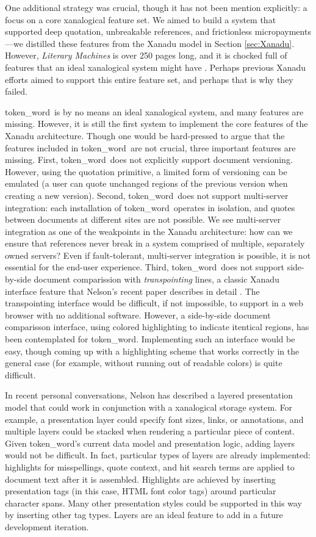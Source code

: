 \documentclass{acm_proc_article-sp}
\newcommand{\tw}{token\_word}
\begin{document}
One additional strategy was crucial, though it has not been mention explicitly:  a focus on a core xanalogical feature set.
We aimed to build a system that supported deep quotation, unbreakable references, and frictionless micropayments---we distilled these features from the Xanadu model in Section \ref{sec:Xanadu}.
However, \textit{Literary Machines} is over 250 pages long, and it is chocked full of features that an ideal xanalogical system might have \cite{NelsonLiteraryMachines}.
Perhaps previous Xanadu efforts aimed to support this entire feature set, and perhaps that is why they failed.

\tw \  is by no means an ideal xanalogical system, and many features are missing.
However, it is still the first system to implement the core features of the Xanadu architecture.
Though one would be hard-pressed to argue that the features included in \tw \  are not crucial, three important features are missing.
First, \tw \  does not explicitly support document versioning.
However, using the quotation primitive, a limited form of versioning can be emulated (a user can quote unchanged regions of the previous version when creating a new version).
Second, \tw \  does not support multi-server integration:  each installation of \tw \  operates in isolation, and quotes between documents at different sites are not possible.
We see multi-server integration as one of the weakpoints in the Xanadu architecture:  how can we ensure that references never break in a system comprised of multiple, separately owned servers?
Even if fault-tolerant, multi-server integration is possible, it is not essential for the end-user experience. 
Third, \tw \   does not support side-by-side document comparission with \textit{transpointing} lines, a classic Xanadu interface feature that Nelson's recent paper describes in detail \cite{Nelson1999}.
The transpointing interface would be difficult, if not impossible, to support in a web browser with no additional software.
However, a side-by-side document comparisson interface, using colored highlighting to indicate itentical regions, has been contemplated for \tw.
Implementing such an interface would be easy, though coming up with a highlighting scheme that works correctly in the general case (for example, without running out of readable colors) is quite difficult.

In recent personal conversations, Nelson has described a layered presentation model that could work in conjunction with a xanalogical storage system.
For example, a presentation layer could specify font sizes, links, or annotations, and multiple layers could be stacked when rendering a particular piece of content.
Given \tw's current data model and presentation logic, adding layers would not be difficult.
In fact, particular types of layers are already implemented:  highlights for misspellings, quote context, and hit search terms are applied to document text after it is assembled.
Highlights are achieved by inserting presentation tags (in this case, HTML font color tags) around particular character spans.
Many other presentation styles could be supported in this way by inserting other tag types.
Layers are an ideal feature to add in a future development iteration.
\end{document}
